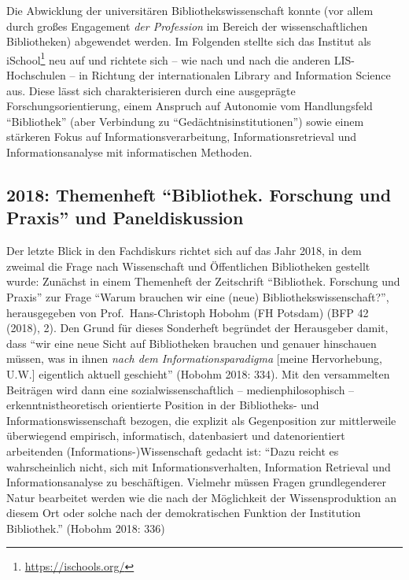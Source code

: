 \documentclass[a4paper,
fontsize=11pt,
oneside,
numbers=noperiodatend,
parskip=half-,
bibliography=totoc,
final
]{scrartcl}
\begin{document}
Die Abwicklung der universitären Bibliothekswissenschaft konnte (vor
allem durch großes Engagement \emph{der Profession} im Bereich der
wissenschaftlichen Bibliotheken) abgewendet werden. Im Folgenden stellte
sich das Institut als iSchool\footnote{\url{https://ischools.org/}} neu
auf und richtete sich -- wie nach und nach die anderen LIS-Hochschulen
-- in Richtung der internationalen Library and Information Science aus.
Diese lässt sich charakterisieren durch eine ausgeprägte
Forschungsorientierung, einem Anspruch auf Autonomie vom Handlungsfeld
\enquote{Bibliothek} (aber Verbindung zu
\enquote{Gedächtnisinstitutionen}) sowie einem stärkeren Fokus auf
Informationsverarbeitung, Informationsretrieval und Informationsanalyse
mit informatischen Methoden.

\hypertarget{themenheft-bibliothek.-forschung-und-praxis-und-paneldiskussion}{%
\subsection{\texorpdfstring{2018: Themenheft \enquote{Bibliothek.
Forschung und Praxis} und
Paneldiskussion}{2018: Themenheft ``Bibliothek. Forschung und Praxis'' und Paneldiskussion}}\label{themenheft-bibliothek.-forschung-und-praxis-und-paneldiskussion}}

Der letzte Blick in den Fachdiskurs richtet sich auf das Jahr 2018, in
dem zweimal die Frage nach Wissenschaft und Öffentlichen Bibliotheken
gestellt wurde: Zunächst in einem Themenheft der Zeitschrift
\enquote{Bibliothek. Forschung und Praxis} zur Frage \enquote{Warum
brauchen wir eine (neue) Bibliothekswissenschaft?}, herausgegeben von
Prof.~Hans-Christoph Hobohm (FH Potsdam) (BFP 42 (2018), 2). Den Grund
für dieses Sonderheft begründet der Herausgeber damit, dass \enquote{wir
eine neue Sicht auf Bibliotheken brauchen und genauer hinschauen müssen,
was in ihnen \emph{nach dem Informationsparadigma} {[}meine
Hervorhebung, U.W.{]} eigentlich aktuell geschieht} (Hobohm 2018: 334).
Mit den versammelten Beiträgen wird dann eine sozialwissenschaftlich --
medienphilosophisch -- erkenntnistheoretisch orientierte Position in der
Bibliotheks- und Informationswissenschaft bezogen, die explizit als
Gegenposition zur mittlerweile überwiegend empirisch, informatisch,
datenbasiert und datenorientiert arbeitenden (Informations-)Wissenschaft
gedacht ist: \enquote{Dazu reicht es wahrscheinlich nicht, sich mit
Informationsverhalten, Information Retrieval und Informationsanalyse zu
beschäftigen. Vielmehr müssen Fragen grundlegenderer Natur bearbeitet
werden wie die nach der Möglichkeit der Wissensproduktion an diesem Ort
oder solche nach der demokratischen Funktion der Institution
Bibliothek.} (Hobohm 2018: 336)
\end{document}
